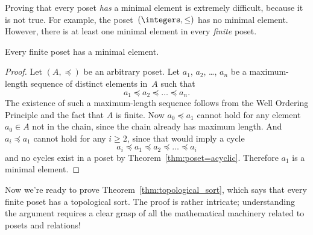 Proving that every poset \emph{has} a minimal element is extremely
difficult, because it is not true.  For example, the
poset~$(\integers, \le)$ has no minimal element.  However, there is at
least one minimal element in every \emph{finite} poset.

\begin{lemma}\label{lem:min_element}
Every finite poset has a minimal element.
\end{lemma}

\begin{proof}
Let $(A, \preceq)$ be an arbitrary poset.  Let $a_1$, $a_2$, \dots,
$a_n$ be a maximum-length sequence of distinct elements in~$A$ such
that
\begin{equation*}
    a_1 \preceq a_2 \preceq \dots \preceq a_n.
\end{equation*}
The existence of such a maximum-length sequence follows from the Well
Ordering Principle and the fact that $A$ is finite.  Now $a_0 \preceq
a_1$ cannot hold for any element $a_0 \in A$ not in the chain, since
the chain already has maximum length.  And $a_i \preceq a_1$ cannot
hold for any $i \ge 2$, since that would imply a cycle
\begin{equation*}
    a_i \preceq a_1 \preceq a_2 \preceq \dots \preceq a_i
\end{equation*}
and no cycles exist in a poset by Theorem~\ref{thm:poset=acyclic}.
Therefore $a_1$ is a minimal element.
\end{proof}

Now we're ready to prove Theorem~\ref{thm:topological_sort}, which
says that every finite poset has a topological sort.  The proof is
rather intricate; understanding the argument requires a clear grasp of
all the mathematical machinery related to posets and relations!

